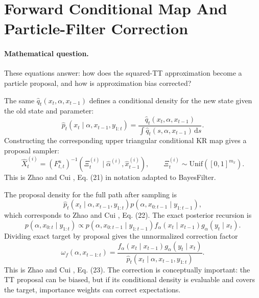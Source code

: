 \documentclass[11pt]{article}
\numberwithin{equation}{section}
\newcommand{\dd}{\,\mathrm d}
\begin{document}
\section{Forward Conditional Map And Particle-Filter Correction}

\paragraph{Mathematical question.}
These equations answer: how does the squared-TT approximation become a
particle proposal, and how is approximation bias corrected?

The same \(\widehat q_t(x_t,\alpha,x_{t-1})\) defines a conditional density for
the new state given the old state and parameter:
\begin{equation}
    \widehat p_t(x_t\mid \alpha,x_{t-1},y_{1:t})
    =
    \frac{\widehat q_t(x_t,\alpha,x_{t-1})}
    {\int \widehat q_t(s,\alpha,x_{t-1})\dd s}.
    \label{eq:p24-f1}
\end{equation}
Constructing the corresponding upper triangular conditional KR map gives a
proposal sampler:
\begin{equation}
    \widehat X_t^{(i)}
    =
    (F_{t,t}^{u})^{-1}
    \left(\Xi_t^{(i)}\mid \widehat\alpha^{(i)},\widehat x_{t-1}^{(i)}\right),
    \qquad
    \Xi_t^{(i)}\sim\mathrm{Unif}([0,1]^{m_x}).
    \label{eq:p24-f2}
\end{equation}
This is Zhao and Cui \cite{zhao2024ttsequential}, Eq. (21) in notation adapted to BayesFilter.

The proposal density for the full path after sampling is
\begin{equation}
    \widehat p_t(x_t\mid \alpha,x_{t-1},y_{1:t})
    p(\alpha,x_{0:t-1}\mid y_{1:t-1}),
    \label{eq:p24-f3}
\end{equation}
which corresponds to Zhao and Cui \cite{zhao2024ttsequential}, Eq. (22).  The exact posterior recursion is
\[
    p(\alpha,x_{0:t}\mid y_{1:t})
    \propto
    p(\alpha,x_{0:t-1}\mid y_{1:t-1})
    f_\alpha(x_t\mid x_{t-1})
    g_\alpha(y_t\mid x_t).
\]
Dividing exact target by proposal gives the unnormalized correction factor
\begin{equation}
    \omega_f(\alpha,x_{t-1:t})
    =
    \frac{
    f_\alpha(x_t\mid x_{t-1})g_\alpha(y_t\mid x_t)}
    {\widehat p_t(x_t\mid \alpha,x_{t-1},y_{1:t})}.
    \label{eq:p24-f4}
\end{equation}
This is Zhao and Cui \cite{zhao2024ttsequential}, Eq. (23).  The correction is conceptually important: the TT
proposal can be biased, but if its conditional density is evaluable and covers
the target, importance weights can correct expectations.
\end{document}
